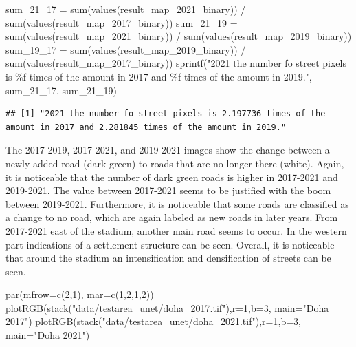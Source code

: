 \documentclass[
]{article}
\newenvironment{Shaded}{\begin{snugshade}}{\end{snugshade}}
\newcommand{\AttributeTok}[1]{\textcolor[rgb]{0.77,0.63,0.00}{#1}}
\newcommand{\DecValTok}[1]{\textcolor[rgb]{0.00,0.00,0.81}{#1}}
\newcommand{\FunctionTok}[1]{\textcolor[rgb]{0.00,0.00,0.00}{#1}}
\newcommand{\NormalTok}[1]{#1}
\newcommand{\OtherTok}[1]{\textcolor[rgb]{0.56,0.35,0.01}{#1}}
\newcommand{\SpecialCharTok}[1]{\textcolor[rgb]{0.00,0.00,0.00}{#1}}
\newcommand{\StringTok}[1]{\textcolor[rgb]{0.31,0.60,0.02}{#1}}
\begin{document}
\begin{Shaded}
\begin{Highlighting}[]
\NormalTok{sum\_21\_17 }\OtherTok{=} \FunctionTok{sum}\NormalTok{(}\FunctionTok{values}\NormalTok{(result\_map\_2021\_binary)) }\SpecialCharTok{/} \FunctionTok{sum}\NormalTok{(}\FunctionTok{values}\NormalTok{(result\_map\_2017\_binary))}
\NormalTok{sum\_21\_19 }\OtherTok{=} \FunctionTok{sum}\NormalTok{(}\FunctionTok{values}\NormalTok{(result\_map\_2021\_binary)) }\SpecialCharTok{/} \FunctionTok{sum}\NormalTok{(}\FunctionTok{values}\NormalTok{(result\_map\_2019\_binary))}
\NormalTok{sum\_19\_17 }\OtherTok{=} \FunctionTok{sum}\NormalTok{(}\FunctionTok{values}\NormalTok{(result\_map\_2019\_binary)) }\SpecialCharTok{/} \FunctionTok{sum}\NormalTok{(}\FunctionTok{values}\NormalTok{(result\_map\_2017\_binary))}
\FunctionTok{sprintf}\NormalTok{(}\StringTok{"2021 the number fo street pixels is \%f times of the amount in 2017 and \%f times of the amount in 2019."}\NormalTok{, sum\_21\_17, sum\_21\_19)}
\end{Highlighting}
\end{Shaded}

\begin{verbatim}
## [1] "2021 the number fo street pixels is 2.197736 times of the amount in 2017 and 2.281845 times of the amount in 2019."
\end{verbatim}

The 2017-2019, 2017-2021, and 2019-2021 images show the change between a
newly added road (dark green) to roads that are no longer there (white).
Again, it is noticeable that the number of dark green roads is higher in
2017-2021 and 2019-2021. The value between 2017-2021 seems to be
justified with the boom between 2019-2021. Furthermore, it is noticeable
that some roads are classified as a change to no road, which are again
labeled as new roads in later years. From 2017-2021 east of the stadium,
another main road seems to occur. In the western part indications of a
settlement structure can be seen. Overall, it is noticeable that around
the stadium an intensification and densification of streets can be seen.

\begin{Shaded}
\begin{Highlighting}[]
\FunctionTok{par}\NormalTok{(}\AttributeTok{mfrow=}\FunctionTok{c}\NormalTok{(}\DecValTok{2}\NormalTok{,}\DecValTok{1}\NormalTok{), }\AttributeTok{mar=}\FunctionTok{c}\NormalTok{(}\DecValTok{1}\NormalTok{,}\DecValTok{2}\NormalTok{,}\DecValTok{1}\NormalTok{,}\DecValTok{2}\NormalTok{))}
\FunctionTok{plotRGB}\NormalTok{(}\FunctionTok{stack}\NormalTok{(}\StringTok{"data/testarea\_unet/doha\_2017.tif"}\NormalTok{),}\AttributeTok{r=}\DecValTok{1}\NormalTok{,}\AttributeTok{b=}\DecValTok{3}\NormalTok{, }\AttributeTok{main=}\StringTok{"Doha 2017"}\NormalTok{)}
\FunctionTok{plotRGB}\NormalTok{(}\FunctionTok{stack}\NormalTok{(}\StringTok{"data/testarea\_unet/doha\_2021.tif"}\NormalTok{),}\AttributeTok{r=}\DecValTok{1}\NormalTok{,}\AttributeTok{b=}\DecValTok{3}\NormalTok{, }\AttributeTok{main=}\StringTok{"Doha 2021"}\NormalTok{)}
\end{Highlighting}
\end{Shaded}
\end{document}
